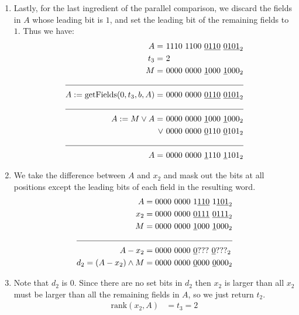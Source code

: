 \begin{itemize}
\begin{enumerate}
        \item
        Lastly, for the last ingredient of the parallel comparison, we discard the fields in $A$ whose leading bit is $1$, and set the leading bit of the remaining fields to $1$. Thus we have:
        \begin{align*}
            A = &\ 1110\ 1100\ \underline{0110}\ \underline{0101}_2 \\
            t_3 = &\ 2 \\ 
            M = &\ 0000\ 0000\ \underline{1}000\ \underline{1}000_2 \\
            \cline{1-2}
            A := \text{getFields}(0, t_3, b, A) = &\ 0000\ 0000\ \underline{0110}\ \underline{0101}_2 \\
            \cline{1-2}
            A := M \vee A = &\ 0000\ 0000\ \underline{1}000\ \underline{1}000_2 \\
            \vee &\ 0000\ 0000\ \underline{0}110\ \underline{0}101_2 \\
            \cline{1-2}
            A = &\ 0000\ 0000\ \underline{1}110\ \underline{1}101_2
        \end{align*}
        
        \item
        We take the difference between $A$ and $x_2$ and mask out the bits at all positions except the leading bits of each field in the resulting word.
        \begin{align*}
            A &= 0000\ 0000\ 1\underline{110}\ 1\underline{101}_2 \\
            x_2 &= 0000\ 0000\ \underline{0111}\ \underline{0111}_2 \\
            M &= 0000\ 0000\ \underline{1}000\ \underline{1}000_2 \\
            \cline{1-2}
            A - x_2 &= 0000\ 0000\ \underline{0}???\ \underline{0}???_2 \\
            d_2 = (A - x_2) \wedge M &= 0000\ 0000\ \underline{0}000\ \underline{0}000_2 \\
        \end{align*}
        
        \item
        Note that $d_2$ is $0$. Since there are no set bits in $d_2$ then $x_2$ is larger than all $x_2$ must be larger than all the remaining fields in $A$, so we just return $t_2$.
        \begin{align*}
            \text{rank}(x_2,A) &= t_3 = 2
        \end{align*}
        
    \end{enumerate}
\end{itemize}


